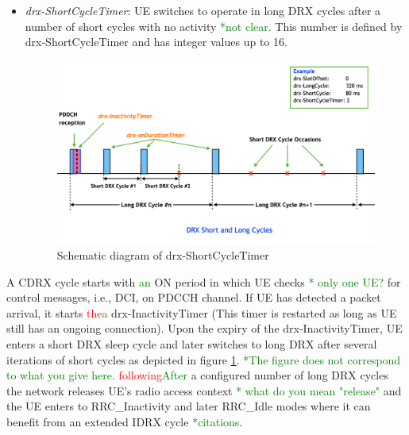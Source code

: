 \documentclass[]{IEEEtran}
\newcommand{\CAREPL}[2]{\textcolor{red}{#1}\textcolor{green}{#2}}
\begin{document}
\begin{itemize}
    \item \textit{drx-ShortCycleTimer}: UE switches to operate in long DRX cycles after a number of short cycles with no activity \CAREPL{}{*not clear}. This number is defined by drx-ShortCycleTimer and has integer values up to 16.
\begin{figure}
    \centering
    \includegraphics[width=\linewidth]{Pictures/Schematic diagram of drx-ShortCycleTimer.png}
    \caption{Schematic diagram of drx-ShortCycleTimer}
    \label{fig:5g-drx-ShortCycleTimer}
\end{figure}

\end{itemize}

A CDRX cycle starts with \CAREPL{}{an} ON period in which UE checks \CAREPL{}{* only one UE?} for control messages, i.e., DCI, on PDCCH channel. 
If UE has detected a packet arrival, it starts \CAREPL{the}{a} drx-InactivityTimer (This timer is restarted as long as UE still has an ongoing connection). 
Upon the expiry of the drx-InactivityTimer, UE enters a short DRX sleep cycle and later switches to long DRX after several iterations of short cycles as depicted in figure \ref{fig:5g-drx-ShortCycleTimer}. \CAREPL{}{*The figure does not correspond to what you give here.} 
\CAREPL{following}{After} a configured number of long DRX cycles the network releases UE's radio access context \CAREPL{}{* what do you mean "release"} and the UE enters to RRC\_Inactivity and later RRC\_Idle modes where it can benefit from an extended IDRX cycle \CAREPL{}{*citations}.
\end{document}
